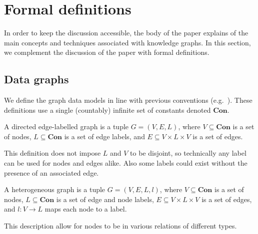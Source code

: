 \chapter{Formal definitions}\label{app:formal-definitions}
In order to keep the discussion accessible, the body of the paper explains of the main concepts and techniques associated with knowledge graphs. In this section, we complement the discussion of the paper with formal definitions.

\section{Data graphs}\label{app:data-graphs}
We define the graph data models in line with previous conventions (e.g.~\cite {Angles2017FoundationmodernQueryLnguagesforGraphDatabases}). These definitions use a single (countably) infinite set of constants denoted $\textbf{Con}$.


\begin{definition}\label{def:directed-edge-labelled-graph}
    A directed edge-labelled graph is a tuple $G = (V, E, L)$, where $V \subseteq \textbf{Con}$ is a set of nodes, $L \subseteq \textbf{Con}$ is a set of edge labels, and $E \subseteq V \times L \times V$ is a set of edges.
\end{definition}

This definition does not impose $L$ and $V$ to be disjoint, so technically any label can be used for nodes and edges alike. Also some labels could exist without the presence of an associated edge.


\begin{definition}\label{def:heterogeneous-graph}
    A heterogeneous graph is a tuple $G = (V, E, L, l)$, where $V \subseteq \textbf{Con}$ is a set of nodes, $L \subseteq \textbf{Con}$ is a set of edge and node labels, $E \subseteq V \times L \times V$ is a set of edges, and $l : V \to L$ maps each node to a label.
    \end{definition}
This description allow for nodes to be in various relations of different types.

